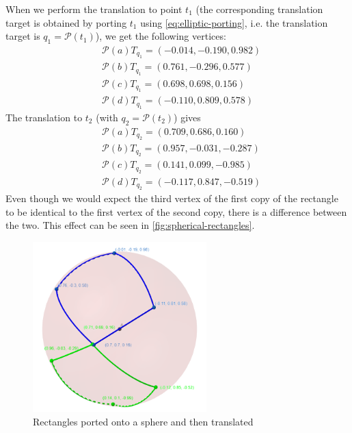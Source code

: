When we perform the translation to point $t_1$ (the corresponding translation target is obtained by porting $t_1$ using \autoref{eq:elliptic-porting}, i.e. the translation target is $q_1 = \mathcal{P}(t_1)$), we get the following vertices:
\begin{equation*}
    \begin{split}
         & \mathcal{P}(a)T_{q_1} =  (-0.014, -0.190, 0.982) \\
         & \mathcal{P}(b)T_{q_1} = (0.761, -0.296, 0.577)   \\
         & \mathcal{P}(c)T_{q_1} = (0.698, 0.698, 0.156)    \\
         & \mathcal{P}(d)T_{q_1} = (-0.110, 0.809, 0.578)
    \end{split}
\end{equation*}
The translation to $t_2$ (with $q_2 = \mathcal{P}(t_2)$) gives
\begin{equation*}
    \begin{split}
         & \mathcal{P}(a)T_{q_2} = (0.709, 0.686, 0.160)   \\
         & \mathcal{P}(b)T_{q_2} = (0.957, -0.031, -0.287) \\
         & \mathcal{P}(c)T_{q_2} = (0.141, 0.099, -0.985)  \\
         & \mathcal{P}(d)T_{q_2} = (-0.117, 0.847, -0.519)
    \end{split}
\end{equation*}
Even though we would expect the third vertex of the first copy of the rectangle to be identical to the first vertex of the second copy, there is a difference between the two.
This effect can be seen in \autoref{fig:spherical-rectangles}.
\begin{figure}[h]
    \centering
    \includegraphics[width=0.6\textwidth]{chapters/theoretical_foundations/sections/non-eudlidean-spaces/resources/spherical-rectangles.png}
    \caption{Rectangles ported onto a sphere and then translated}
    \label{fig:spherical-rectangles}
\end{figure}
